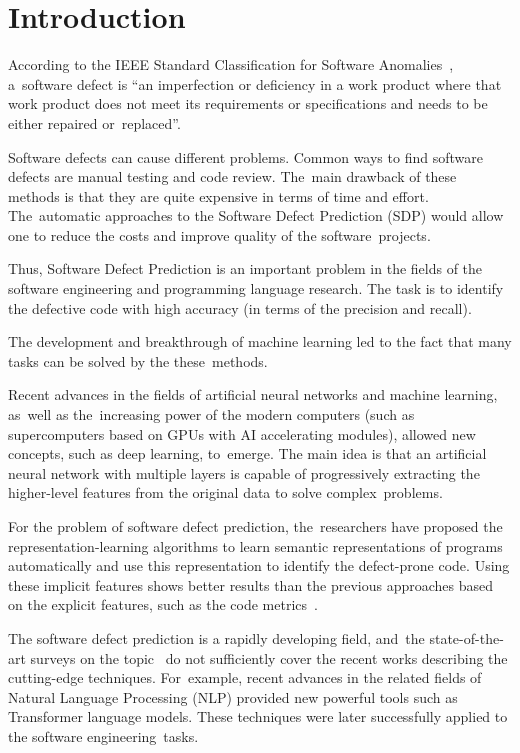 \documentclass[mathematics,review,accept,moreauthors,pdftex]{Definitions/mdpi}
\begin{document}

\section{Introduction}\label{sec_1}

According to the IEEE Standard Classification for Software Anomalies~\cite{ieee_standard}, a~software defect is ``an imperfection or deficiency in a work product where that work product does not meet its requirements or specifications and needs to be either repaired or~replaced''.

Software defects can cause different problems.
Common ways to find software defects are manual testing and code review. The~main drawback of these methods is that they are quite expensive in terms of time and effort. The~automatic approaches to the Software Defect Prediction (SDP) would allow one to reduce the costs and improve quality of the software~projects.

Thus, Software Defect Prediction is an important problem in the fields of the software engineering and programming language research.
The task is to identify the defective code with high accuracy (in terms of the precision and recall).

The development and breakthrough of machine learning led to the fact that many tasks can be solved by the these~methods.

Recent advances in the fields of artificial neural networks and machine learning, as~well as the~increasing power of the modern computers (such as supercomputers based on GPUs with AI accelerating modules), allowed new concepts, such as deep learning, to~emerge.
The main idea is that an artificial neural network with multiple layers is capable of progressively extracting the higher-level features from the original data to solve complex~problems.

For the problem of software defect prediction, the~researchers have proposed the re\-pre\-sen\-ta\-tion-learning algorithms to learn semantic representations of programs automatically and use this representation to identify the defect-prone code. Using these implicit features shows better results than the previous approaches based on the explicit features, such as the code metrics~\cite{WangEtAl2016}. 

The software defect prediction is a rapidly developing field, and~the state-of-the-art surveys on the topic~\cite{OmriSinz2020Survey,yang2020survey,ShenChen2020Survey} do not sufficiently cover the recent works describing the cutting-edge techniques. For~example, recent advances in the related fields of Natural Language Processing (NLP) provided new powerful tools such as Transformer language models. These techniques were later successfully applied to the software engineering~tasks. 
\end{document}
